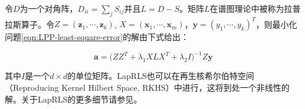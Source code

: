 令$D$为一个对角阵，$D_{ii}=\sum_j
S_{ij}$并且$L=D-S$。矩阵$L$在谱图理论中被称为拉普拉斯算子。令$Z=(\textbf{z}_1,
\cdots, \textbf{z}_k)$, $X=(\textbf{x}_1, \cdots,
\textbf{x}_m)$，$\textbf{y}=(y_1, \cdots,
y_k)^T$，则最小化问题\ref{eqn:LPP-least-square-error}的解由下式给出：

\begin{equation}\label{eqn:LapRLS-solution}
\widehat{\textbf{a}}=\big(ZZ^T + \lambda_1 XLX^T +\lambda_2 I
\big)^{-1} Z\textbf{y}
\end{equation}

其中$I$是一个$d \times
d$的单位矩阵。LapRLS也可以在再生核希尔伯特空间（Reproducing Kernel
Hilbert Space,
RKHS）中进行，这将到处一个非线性的解。关于LapRLS的更多细节请参见\cite{Manifold-Regularization-Journal}。

